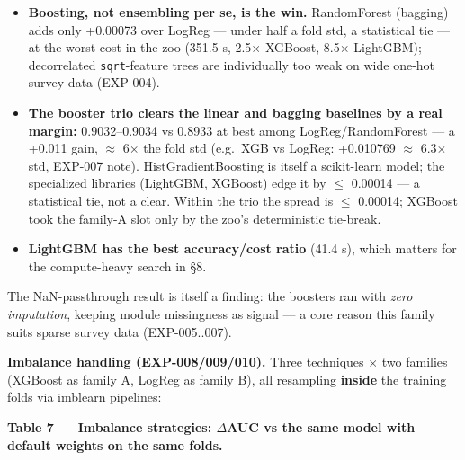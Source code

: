 \documentclass[11pt,a4paper]{article}
\providecommand{\tightlist}{\setlength{\itemsep}{2pt}\setlength{\parskip}{0pt}}
\begin{document}
\begin{itemize}
\tightlist
\item
  \textbf{Boosting, not ensembling per se, is the win.} RandomForest
  (bagging) adds only +0.00073 over LogReg --- under half a fold std, a
  statistical tie --- at the worst cost in the zoo (351.5 s, 2.5$\times$
  XGBoost, 8.5$\times$ LightGBM); decorrelated \texttt{sqrt}-feature trees are
  individually too weak on wide one-hot survey data (EXP-004).
\item
  \textbf{The booster trio clears the linear and bagging baselines by a
  real margin:} 0.9032--0.9034 vs 0.8933 at best among
  LogReg/RandomForest --- a +0.011 gain, $\approx$ 6$\times$ the fold std (e.g.~XGB vs
  LogReg: +0.010769 $\approx$ 6.3$\times$ std, EXP-007 note). HistGradientBoosting is
  itself a scikit-learn model; the specialized libraries (LightGBM,
  XGBoost) edge it by $\le$ 0.00014 --- a statistical tie, not a clear.
  Within the trio the spread is $\le$ 0.00014; XGBoost took the family-A
  slot only by the zoo's deterministic tie-break.
\item
  \textbf{LightGBM has the best accuracy/cost ratio} (41.4 s), which
  matters for the compute-heavy search in \S{}8.
\end{itemize}

The NaN-passthrough result is itself a finding: the boosters ran with
\emph{zero imputation}, keeping module missingness as signal --- a core
reason this family suits sparse survey data (EXP-005..007).

\textbf{Imbalance handling (EXP-008/009/010).} Three techniques $\times$ two
families (XGBoost as family A, LogReg as family B), all resampling
\textbf{inside} the training folds via imblearn pipelines:

\textbf{Table 7 --- Imbalance strategies: $\Delta$AUC vs the same model with
default weights on the same folds.}
\end{document}
